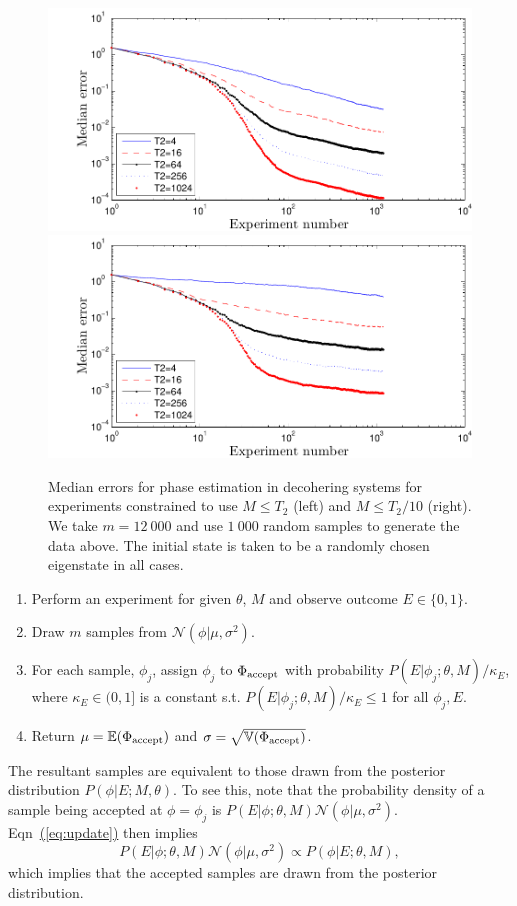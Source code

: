 \documentclass[aps,pra,amsmath,twocolumn,amssymb,superscriptaddress]{revtex4-1}
\newcommand{\eq}[1]{\hyperref[eq:#1]{(\ref*{eq:#1})}}
\begin{document}
\begin{figure}
    \begin{centering}
\includegraphics[width=0.45\linewidth]{T2plot_full.pdf}
        \includegraphics[width=0.45\linewidth]{T2plot.pdf}
    \end{centering}
    \caption{\label{fig:T2plot}
Median errors for phase estimation in decohering systems for experiments constrained to use $M\le T_2$ (left) and $M\le T_2/10$ (right).  We take $m=12~000$ and use $1~000$ random samples to generate the data above.  The initial state is taken to be a randomly chosen eigenstate in all cases.
    }
\end{figure}



\begin{enumerate}
\item Perform an experiment for given $\theta$, $M$ and observe outcome $E\in \{0,1\}$.
\item Draw $m$ samples from $\mathcal{N}(\phi|\mu,\sigma^2)$.
\item For each sample, $\phi_j$, assign $\phi_j$ to $\Phi_{\rm accept}$ with probability $P(E|\phi_j;\theta,M)/\kappa_E$, where $\kappa_E\in (0,1]$ is a constant s.t. $P(E|\phi_j;\theta,M)/\kappa_E\le 1$ for all $\phi_j,E$.
\item Return $\mu = \mathbb{E}(\Phi_{\rm accept})$ and $\sigma =\sqrt{\mathbb{V}(\Phi_{\rm accept})}$.
\end{enumerate}

The resultant samples are equivalent to those drawn from the posterior distribution
$P(\phi|E;M,\theta)$.  To see this, note that the probability density of a sample being accepted at $\phi=\phi_j$ is $ P(E | \phi; \theta, M) \mathcal{N}(\phi|\mu,\sigma^2)$.  Eqn~\eq{update} then implies 
\begin{equation}
    P(E | \phi; \theta, M) \mathcal{N}(\phi|\mu,\sigma^2) \propto P(\phi | E; \theta, M),
\end{equation}
which implies that the accepted samples are drawn from the posterior distribution.  
\end{document}

